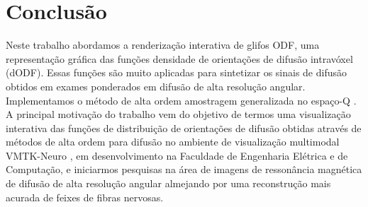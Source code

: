 \documentclass[
    12pt,                %
    oneside,            %
    a4paper,            %
    english,            %
    french,                %
    spanish,            %
    brazil                %
    ]{abntex2}
\begin{document}



%
%


%
%


\chapter{Conclusão}
\label{chap::conclusao}


Neste trabalho abordamos a renderização interativa de glifos ODF, uma representação gráfica das funções densidade de orientações de difusão intravóxel (dODF). Essas funções são muito aplicadas para sintetizar os sinais de difusão obtidos em exames ponderados em difusão de alta resolução angular. Implementamos o método de alta ordem amostragem generalizada no espaço-Q \cite{yeh2010}. A principal motivação do trabalho vem do objetivo de termos uma visualização interativa das funções de distribuição de orientações de difusão obtidas através de métodos de alta ordem para difusão no ambiente de visualização multimodal VMTK-Neuro \cite{VMTKNeuro}, em desenvolvimento na Faculdade de Engenharia Elétrica e de Computação, e iniciarmos pesquisas na área de imagens de ressonância magnética de difusão de alta resolução angular almejando por uma reconstrução mais acurada de feixes de fibras nervosas.
\end{document}
